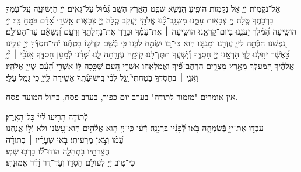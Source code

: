 \documentclass[twoside, openany, parskip=half, 11pt]{book}
\begin{document}
אֵל־נְֿֿקָמ֥וֹת יְיָ֑ אֵ֖ל נְֿקָמ֣וֹת הוֹפִֽיעַ׃ 
הִ֭נָּשֵׂא שֹׁפֵ֣ט הָאָ֑רֶץ הָשֵׁ֥ב גְּֿ֝מ֗וּל עַל־גֵּאִֽים׃ 
ייָ֥ הַיְשׁוּעָ֑ה עַֽל־עַמְּֿךָ֖ בִרְכָתֶ֣ךָ סֶּֽלָה׃ 
 יְיָ֣ צְֿבָא֣וֹת עִמָּ֑נוּ מִשְׂגָּֽב־לָ֨נוּ אֱלֹהֵ֖י יַעֲקֹ֣ב סֶֽלָה׃ 
 יְיָ֥ צְֿבָא֑וֹת אַֽשְׁרֵ֥י אָ֝דָ֗ם בֹּטֵ֥חַ בָּֽךְ׃ 
 יְיָ֥ הוֹשִׁ֑יעָה הַ֝מֶּ֗לֶךְ יַעֲנֵ֥נוּ בְֿיוֹם־קׇרְאֵֽנוּ׃ 
הוֹשִׁ֤יעָה ׀ אֶת־עַמֶּ֗ךָ וּבָרֵ֥ךְ אֶת־נַחֲלָתֶ֑ךָ וּֽרְעֵ֥ם וְֿ֝נַשְּֿׂאֵ֗ם עַד־הָעוֹלָֽם׃ 
נַ֭פְשֵׁנוּ חִכְּֿתָ֣ה לַֽייָ֑ עֶזְרֵ֖נוּ וּמָגִנֵּ֣נוּ הֽוּא׃
כִּי־ב֭וֹ יִשְׂמַ֣ח לִבֵּ֑נוּ כִּ֤י בְֿשֵׁ֖ם קׇדְשׁ֣וֹ בָטָֽחְֿנוּ׃ 
יְֿהִי־חַסְדְּֿֿךָ֣ יְיָ֣ עָלֵ֑ינוּ כַּ֝אֲשֶׁ֗ר יִחַ֥לְנוּ לָֽךְ׃ 
הַרְאֵ֣נוּ יְיָ֣ חַסְדֶּ֑ךָ וְֿ֝יֶשְׁעֲךָ֗ תִּתֶּן־לָֽנוּ׃ 
ק֭וּמָֽה עֶזְרָ֣תָה לָּ֑נוּ וּ֝פְדֵ֗נוּ לְֿמַ֣עַן חַסְדֶּֽךָ׃ 
אָֽנֹכִ֨י ׀ יְ֘יָ֤ אֱלֹהֶ֗יךָ הַֽ֭מַּעַלְךָ מֵאֶ֣רֶץ מִצְרָ֑יִם הַרְחֶב־פִּ֗֝יךָ וַאֲמַלְאֵֽהוּ׃ 
אַשְׁרֵ֣י הָ֭עָם שֶׁכָּ֣כָה לּ֑וֹ אַֽשְׁרֵ֥י הָ֝עָ֗ם שֱׁייָ֥ אֱלֹהָֽיו׃ 
וַאֲנִ֤י ׀ בְּֿחַסְדְּֿֿךָ֣ בָטַחְתִּי֮ יָ֤גֵ֥ל לִבִּ֗י בִּֽישׁוּעָ֫תֶ֥ךָ אָשִׁ֥ירָה לַֽייָ֑ כִּ֖י גָמַ֣ל עָלָֽי׃ 

\negline

\begin{narrow}
\begin{scriptsize} %
\textsf{
אין אומרים "מזמור לתודה" בערב יום כפור, בערב פסח, בחול המועד פסח.\\
}\end{scriptsize}
 לְֿתוֹדָ֑ה \hfill
הָרִ֥יעוּ לַ֝ייָ֗ כׇּל־הָאָֽרֶץ׃\\
עִבְד֣וּ אֶת־יְיָ֣ בְּֿשִׂמְחָ֑ה \hfill בֹּ֥אוּ לְֿ֝פָנָ֗יו בִּרְנָנָֽה׃
דְּֿע֗וּ כִּֽי־יְיָ ה֤וּא אֱלֹ֫הִ֥ים \hfill הֽוּא־עָ֭שָׂנוּ ולא וְֿל֣וֹ אֲנַ֑חְנוּ\\ עַ֝מּ֗וֹ וְֿצֹ֣אן מַרְעִיתֽוֹ׃ \hfill
בֹּ֤אוּ שְֿׁעָרָ֨יו ׀ בְּֿתוֹדָ֗ה \\ חֲצֵרֹתָ֥יו בִּתְהִלָּ֑ה \hfill הוֹדוּ־ל֗֝וֹ בָּרְֿכ֥וּ שְֿׁמֽוֹ׃\\
כִּי־ט֣וֹב יְיָ֭ לְֿעוֹלָ֣ם חַסְדּ֑וֹ \hfill וְֿעַד־דֹּ֥ר וָ֝דֹ֗ר אֱמוּנָתֽוֹ׃
\end{narrow}
\end{document}
